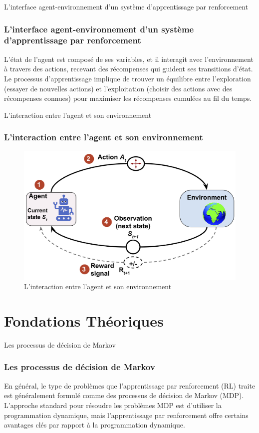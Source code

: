 \documentclass[serif, aspectratio=169]{beamer}
\begin{document}
\begin{frame}{L'interface agent-environnement d'un système d'apprentissage par renforcement}
	\frametitle<presentation>{L'interface agent-environnement d'un système d'apprentissage par renforcement}
	
	L'état de l'agent est composé de ses variables, et il interagit avec l'environnement à travers des actions, recevant des récompenses qui guident ses transitions d'état. Le processus d'apprentissage implique de trouver un équilibre entre l'exploration (essayer de nouvelles actions) et l'exploitation (choisir des actions avec des récompenses connues) pour maximiser les récompenses cumulées au fil du temps. 
	
\end{frame}

\begin{frame}{L'interaction entre l'agent et son environnement}
	\frametitle<presentation>{L'interaction entre l'agent et son environnement}
	
	\begin{figure}[htpb]
		\centering
		\includegraphics[keepaspectratio, scale=0.6]{images/interface-agent-environnement.png}
		\caption{L'interaction entre l'agent et son environnement}
	\end{figure}
	
\end{frame}


\section{Fondations Théoriques}

\begin{frame}{Les processus de décision de Markov}
	\frametitle<presentation>{Les processus de décision de Markov}
	
	En général, le type de problèmes que l'apprentissage par renforcement (RL) traite est généralement formulé comme des processus de décision de Markov (MDP). L'approche standard pour résoudre les problèmes MDP est d'utiliser la programmation dynamique, mais l'apprentissage par renforcement offre certains avantages clés par rapport à la programmation dynamique. 
	
\end{frame}
\end{document}
